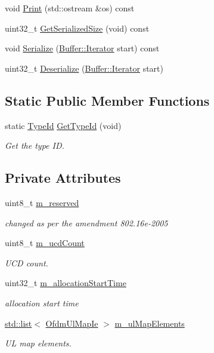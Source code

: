 \begin{DoxyCompactItemize}
\item 
void \hyperlink{classns3_1_1UlMap_ad0b5f61ad9ae8debe3d8494794c07278}{Print} (std\+::ostream \&os) const 
\item 
uint32\+\_\+t \hyperlink{classns3_1_1UlMap_a4c7af71c4aa498af8057c8bf650c96d6}{Get\+Serialized\+Size} (void) const 
\item 
void \hyperlink{classns3_1_1UlMap_aaba9c47a0e8188cbbbdba6cc250dcb1e}{Serialize} (\hyperlink{classns3_1_1Buffer_1_1Iterator}{Buffer\+::\+Iterator} start) const 
\item 
uint32\+\_\+t \hyperlink{classns3_1_1UlMap_a9bb02bf675c74186e4d0918954adfea4}{Deserialize} (\hyperlink{classns3_1_1Buffer_1_1Iterator}{Buffer\+::\+Iterator} start)
\end{DoxyCompactItemize}
\subsection*{Static Public Member Functions}
\begin{DoxyCompactItemize}
\item 
static \hyperlink{classns3_1_1TypeId}{Type\+Id} \hyperlink{classns3_1_1UlMap_a5884a81abaed193522a3ca4ea30122be}{Get\+Type\+Id} (void)
\begin{DoxyCompactList}\small\item\em Get the type ID. \end{DoxyCompactList}\end{DoxyCompactItemize}
\subsection*{Private Attributes}
\begin{DoxyCompactItemize}
\item 
uint8\+\_\+t \hyperlink{classns3_1_1UlMap_a5ac6702cabf1acf23fb0556f7d0221fd}{m\+\_\+reserved}
\begin{DoxyCompactList}\small\item\em changed as per the amendment 802.\+16e-\/2005 \end{DoxyCompactList}\item 
uint8\+\_\+t \hyperlink{classns3_1_1UlMap_a3bb89d3859c1574887aa8df71630e832}{m\+\_\+ucd\+Count}
\begin{DoxyCompactList}\small\item\em U\+CD count. \end{DoxyCompactList}\item 
uint32\+\_\+t \hyperlink{classns3_1_1UlMap_ac5e046fb55c4533f264477645758d089}{m\+\_\+allocation\+Start\+Time}
\begin{DoxyCompactList}\small\item\em allocation start time \end{DoxyCompactList}\item 
\hyperlink{openflow-interface_8h_afd9bcfa176617760671b67580f536fa7}{std\+::list}$<$ \hyperlink{classns3_1_1OfdmUlMapIe}{Ofdm\+Ul\+Map\+Ie} $>$ \hyperlink{classns3_1_1UlMap_ad3c135ad9afb96b612ec44d6b47c54de}{m\+\_\+ul\+Map\+Elements}
\begin{DoxyCompactList}\small\item\em UL map elements. \end{DoxyCompactList}\end{DoxyCompactItemize}
